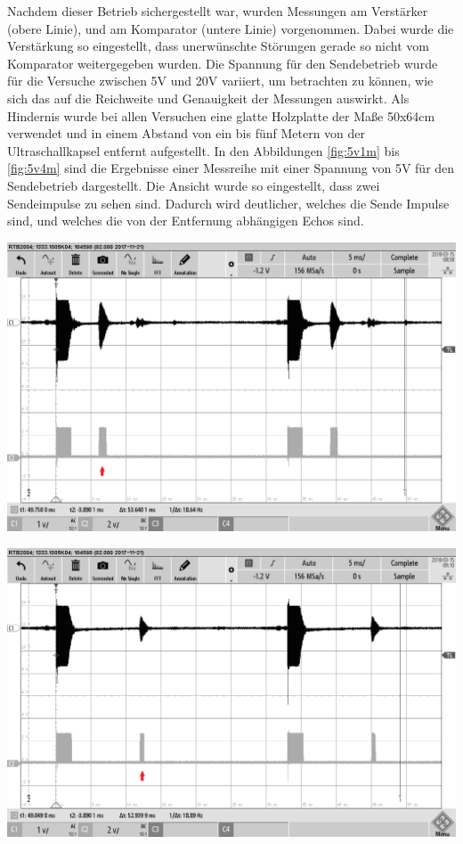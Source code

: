 Nachdem dieser Betrieb sichergestellt war, wurden Messungen am Verstärker (obere Linie), und am Komparator (untere Linie) vorgenommen. Dabei wurde die Verstärkung so eingestellt, dass unerwünschte Störungen gerade so nicht vom Komparator weitergegeben wurden. Die Spannung für den Sendebetrieb wurde für die Versuche zwischen 5V und 20V variiert, um betrachten zu können, wie sich das auf die Reichweite und Genauigkeit der Messungen auswirkt. Als Hindernis wurde bei allen Versuchen eine glatte Holzplatte der Maße 50x64cm verwendet und in einem Abstand von ein bis fünf Metern von der Ultraschallkapsel entfernt aufgestellt. In den Abbildungen \ref{fig:5v1m} bis \ref{fig:5v4m} sind die Ergebnisse einer Messreihe mit einer Spannung von 5V für den Sendebetrieb dargestellt. Die Ansicht wurde so eingestellt, dass zwei Sendeimpulse zu sehen sind. Dadurch wird deutlicher, welches die Sende Impulse sind, und welches die von der Entfernung abhängigen Echos sind.\\
\begin{minipage}{0.5\textwidth}
\includegraphics[width=1\textwidth%
]{Abbildungen/MessungenP2/5V/1mb.PNG}
\label{fig:5v1m}
\end{minipage}
\begin{minipage}{0.5\textwidth}
\includegraphics[width=1\textwidth%
]{Abbildungen/MessungenP2/5V/2mb.PNG}
\label{fig:5v2m}
\end{minipage}
